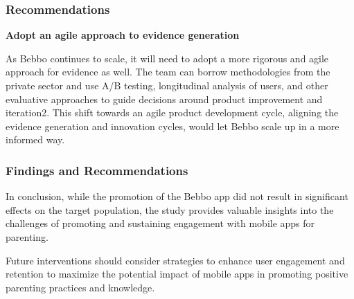 \documentclass[aspectratio=169]{beamer}
\begin{document}
\begin{frame}
\frametitle{Recommendations}       

\textbf{Adopt an agile approach to evidence generation}

As Bebbo continues to scale, it will need to adopt a more rigorous and agile approach for evidence as well. The team can borrow methodologies from the private sector and use A/B testing, longitudinal analysis of users, and other evaluative approaches to guide decisions around product improvement and iteration2.  This shift towards an agile product development cycle, aligning the evidence generation and innovation cycles, would let Bebbo scale up in a more informed way.  
\end{frame}

\begin{frame}
   \frametitle{Findings and Recommendations}

  In conclusion, while the promotion of the Bebbo app did not result in significant effects on the target population, the study provides valuable insights into the challenges of promoting and sustaining engagement with mobile apps for parenting. 

Future interventions should consider strategies to enhance user engagement and retention to maximize the potential impact of mobile apps in promoting positive parenting practices and knowledge. 
\end{frame}


\end{document}
